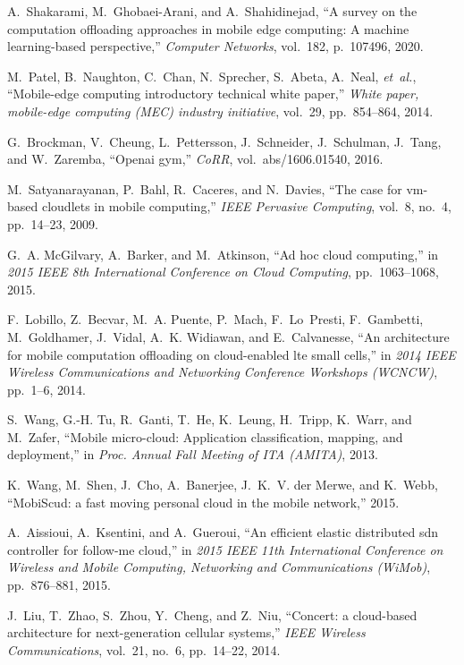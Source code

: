 \documentclass[conference]{IEEEtran}
\begin{document}
\begin{thebibliography}{1}

A.~Shakarami, M.~Ghobaei-Arani, and A.~Shahidinejad, ``A survey on the
  computation offloading approaches in mobile edge computing: A machine
  learning-based perspective,'' {\em Computer Networks}, vol.~182, p.~107496,
  2020.

M.~Patel, B.~Naughton, C.~Chan, N.~Sprecher, S.~Abeta, A.~Neal, {\em et~al.},
  ``Mobile-edge computing introductory technical white paper,'' {\em White
  paper, mobile-edge computing (MEC) industry initiative}, vol.~29,
  pp.~854--864, 2014.

G.~Brockman, V.~Cheung, L.~Pettersson, J.~Schneider, J.~Schulman, J.~Tang, and
  W.~Zaremba, ``Openai gym,'' {\em CoRR}, vol.~abs/1606.01540, 2016.

M.~Satyanarayanan, P.~Bahl, R.~Caceres, and N.~Davies, ``The case for vm-based
  cloudlets in mobile computing,'' {\em IEEE Pervasive Computing}, vol.~8,
  no.~4, pp.~14--23, 2009.

G.~A. McGilvary, A.~Barker, and M.~Atkinson, ``Ad hoc cloud computing,'' in
  {\em 2015 IEEE 8th International Conference on Cloud Computing},
  pp.~1063--1068, 2015.

F.~Lobillo, Z.~Becvar, M.~A. Puente, P.~Mach, F.~Lo~Presti, F.~Gambetti,
  M.~Goldhamer, J.~Vidal, A.~K. Widiawan, and E.~Calvanesse, ``An architecture
  for mobile computation offloading on cloud-enabled lte small cells,'' in {\em
  2014 IEEE Wireless Communications and Networking Conference Workshops
  (WCNCW)}, pp.~1--6, 2014.

S.~Wang, G.-H. Tu, R.~Ganti, T.~He, K.~Leung, H.~Tripp, K.~Warr, and M.~Zafer,
  ``Mobile micro-cloud: Application classification, mapping, and deployment,''
  in {\em Proc. Annual Fall Meeting of ITA (AMITA)}, 2013.

K.~Wang, M.~Shen, J.~Cho, A.~Banerjee, J.~K.~V. der Merwe, and K.~Webb,
  ``{MobiScud:} a fast moving personal cloud in the mobile network,'' 2015.

A.~Aissioui, A.~Ksentini, and A.~Gueroui, ``An efficient elastic distributed
  sdn controller for follow-me cloud,'' in {\em 2015 IEEE 11th International
  Conference on Wireless and Mobile Computing, Networking and Communications
  (WiMob)}, pp.~876--881, 2015.

J.~Liu, T.~Zhao, S.~Zhou, Y.~Cheng, and Z.~Niu, ``Concert: a cloud-based
  architecture for next-generation cellular systems,'' {\em IEEE Wireless
  Communications}, vol.~21, no.~6, pp.~14--22, 2014.


\end{thebibliography}
\end{document}
